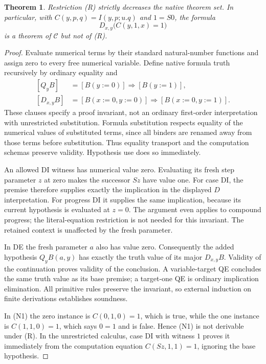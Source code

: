 \documentclass[11pt,letterpaper]{article}
\newtheorem{theorem}{Theorem}[section]
\theoremstyle{definition}\newtheorem{definition}[theorem]{Definition}
\theoremstyle{remark}\newtheorem{remark}[theorem]{Remark}
\begin{document}
\begin{theorem}
Restriction (R) strictly decreases the native theorem set. In particular,
with $C(y,p,q)=I(y,p;u.q)$ and $1=S0$, the formula
\[
D_{x,y}\bigl(C(y,1,x)=1\bigr)
\tag{N1}
\]
is a theorem of $\mathcal C$ but not of (R).
\end{theorem}
\begin{proof}
Evaluate numerical terms by their standard natural-number functions and
assign zero to every free numerical variable. Define native formula truth
recursively by ordinary equality and
\[
\begin{split}
[Q_yB]&=[B(y:=0)]\Rightarrow[B(y:=1)],\\
[D_{x,y}B]&=[B(x:=0,y:=0)]\Rightarrow[B(x:=0,y:=1)].
\end{split}
\]
These clauses specify a proof invariant, not an ordinary first-order
interpretation with unrestricted substitution. Formula substitution
respects equality of the numerical values of substituted terms, since
all binders are renamed away from those terms before substitution.
Thus equality transport and the computation schemas preserve validity.
Hypothesis use does so immediately.

An allowed DI witness has numerical value zero. Evaluating its fresh
step parameter $z$ at zero makes the successor $Sz$ have value one.
For case DI, the premise therefore supplies exactly the implication in
the displayed $D$ interpretation. For progress DI it supplies the same
implication, because its current hypothesis is evaluated at $z=0$.
The argument even applies to compound progress; the literal-equation
restriction is not needed for this invariant. The retained context is
unaffected by the fresh parameter.

In DE the fresh parameter $a$ also has value zero. Consequently the added
hypothesis $Q_yB(a,y)$ has exactly the truth value of its major $D_{x,y}B$.
Validity of the continuation proves validity of the conclusion. A
variable-target QE concludes the same truth value as its base premise;
a target-one QE is ordinary implication elimination. All primitive rules
preserve the invariant, so external induction on finite derivations
establishes soundness.

In (N1) the zero instance is $C(0,1,0)=1$, which is true, while the one
instance is $C(1,1,0)=1$, which says $0=1$ and is false. Hence (N1) is not
derivable under (R). In the unrestricted calculus, case DI with witness
$1$ proves it immediately from the computation equation
$C(Sz,1,1)=1$, ignoring the base hypothesis.
\end{proof}
\end{document}
